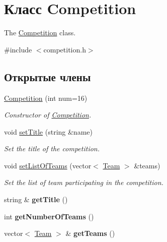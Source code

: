 \hypertarget{classCompetition}{}\section{Класс Competition}
\label{classCompetition}


The \hyperlink{classCompetition}{Competition} class.  




{\ttfamily \#include $<$competition.\+h$>$}

\subsection*{Открытые члены}
\begin{DoxyCompactItemize}
\item 
\hyperlink{classCompetition_a33dba797711840544ba91cd6717d33bf}{Competition} (int num=16)
\begin{DoxyCompactList}\small\item\em Constructor of \hyperlink{classCompetition}{Competition}. \end{DoxyCompactList}\item 
void \hyperlink{classCompetition_a6224a58e4de37db3c2183af9f38e686d}{set\+Title} (string \&name)
\begin{DoxyCompactList}\small\item\em Set the title of the competition. \end{DoxyCompactList}\item 
void \hyperlink{classCompetition_a477e37ceb5a9983fd80ffa9710b78bb0}{set\+List\+Of\+Teams} (vector$<$ \hyperlink{classTeam}{Team} $>$ \&teams)
\begin{DoxyCompactList}\small\item\em Set the list of team participating in the competition. \end{DoxyCompactList}\item 
\hypertarget{classCompetition_ae8c3a0ea9c9f781f1feb267cc180f1f0}{}string \& {\bfseries get\+Title} ()\label{classCompetition_ae8c3a0ea9c9f781f1feb267cc180f1f0}

\item 
\hypertarget{classCompetition_a635ef35726c5e7f0ad90f2868bee1b1c}{}int {\bfseries get\+Number\+Of\+Teams} ()\label{classCompetition_a635ef35726c5e7f0ad90f2868bee1b1c}

\item 
\hypertarget{classCompetition_a88dca551da3de937c32b8629d50871d4}{}vector$<$ \hyperlink{classTeam}{Team} $>$ \& {\bfseries get\+Teams} ()\label{classCompetition_a88dca551da3de937c32b8629d50871d4}


\end{DoxyCompactItemize}
